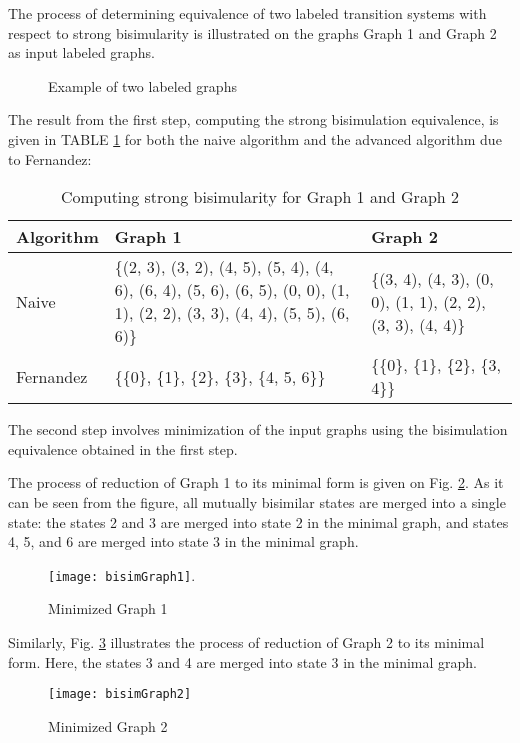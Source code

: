 The process of determining equivalence of two labeled transition systems with respect to strong bisimularity is illustrated 
on the graphs Graph 1 and Graph 2 as input labeled graphs.
\begin{figure}[h!]
\centering
{}
\label{fig:exampleGraphs}
\caption{Example of two labeled graphs}
\end{figure}

The result from the first step, computing the strong bisimulation equivalence, is given in TABLE \ref{table1} for both the
naive algorithm and the advanced algorithm due to Fernandez:
\begin{table}[h!]
\begin{tabular}{| l | p{3.2cm}| p{3.2cm} | }
  \hline                       
  Algorithm & Graph 1 & Graph 2 \\ \hline
  Naive & \{(2, 3), (3, 2), (4, 5), 
(5, 4), (4, 6), (6, 4), (5, 6), (6, 5), (0, 0), (1, 1), (2, 2), (3, 3), (4, 4), (5, 5), (6, 6)\} & \{(3, 4), (4, 3), (0, 0), 
(1, 1), (2, 2), (3, 3), (4, 4)\} \\ \hline
  Fernandez & \{\{0\}, \{1\}, \{2\}, \{3\}, \{4, 5, 6\}\} & \{\{0\}, \{1\}, \{2\}, \{3, 4\}\} \\ \hline  
\end{tabular}
\caption{Computing strong bisimularity for Graph 1 and Graph 2}
\label{table1}
\end{table}

The second step involves minimization of the input graphs using the bisimulation equivalence obtained in the first step. 

The process of reduction of Graph 1 to its minimal form is given on Fig. \ref{fig:bisimGraph1}. As it can be seen from the figure, 
all mutually bisimilar states are merged into a single state: the states 2 and 3 are merged into state 2 in the minimal graph, and 
states 4, 5, and 6 are merged into state 3 in the minimal graph.
\begin{figure}[h!]
\centering
\texttt{[image: bisimGraph1]}.
\caption{Minimized Graph 1}
\label{fig:bisimGraph1}
\end{figure}

Similarly, Fig. \ref{fig:bisimGraph2} illustrates the process of reduction of Graph 2 to its minimal form. Here, the states 
3 and 4 are merged into state 3 in the minimal graph.
\begin{figure}[h!]
\centering
\texttt{[image: bisimGraph2]}
\caption{Minimized Graph 2}
\label{fig:bisimGraph2}
\end{figure}

